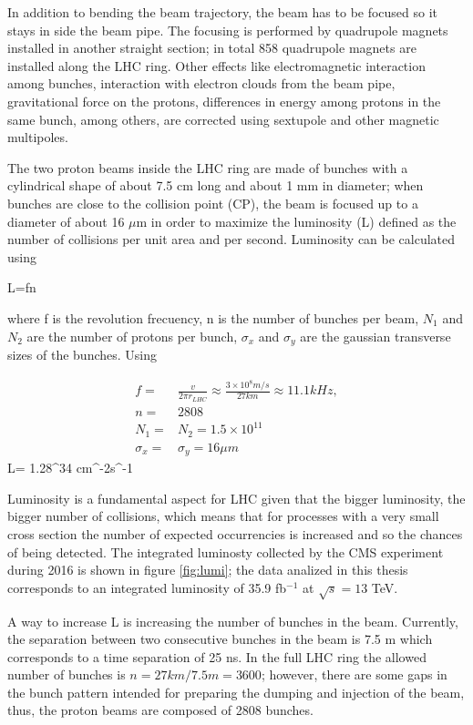 \noindent In addition to bending the beam trajectory, the beam has to be focused so it stays in side the beam pipe. The focusing is performed by quadrupole magnets installed in another straight section; in total 858 quadrupole magnets are installed along the LHC ring. Other effects like electromagnetic interaction among bunches, interaction with electron clouds from the beam pipe, gravitational force on the protons, differences in energy among protons in the same bunch, among others, are corrected using sextupole and other magnetic multipoles.     

\noindent The two proton beams inside the LHC ring are made of bunches with a cylindrical shape of about 7.5 cm long and about 1 mm in diameter; when bunches are close to the collision point (CP), the beam is focused up to a diameter of about 16 $\mu$m in order to maximize the luminosity (L) defined as the number of collisions per unit area and per second. Luminosity can be calculated using

\beqn
L=fn
\eeqn

\noindent where f is the revolution frecuency, n is the number of bunches per beam,  $N_1$ and $N_2$ are the number of protons per bunch,  $\sigma_x$ and $\sigma_y$ are the gaussian transverse sizes of the bunches. Using

\begin{align}
  f=&\frac{v}{2\pi r_{LHC}}\approx\frac{3\times10^8m/s}{27km}\approx 11.1 kHz,\nonumber \\
  n=&2808\nonumber \\ 
  N_1=&N_2=1.5\times 10^{11}\nonumber\\
  \sigma_x=&\sigma_y=16\mu m\nonumber
\end{align}
\beqn
L= 1.28^{34} cm^{-2}s^{-1}
\eeqn

\noindent Luminosity is a fundamental aspect for LHC given that the bigger luminosity, the bigger number of collisions, which means that for processes with a very small cross section the number of expected occurrencies is increased and so the chances of being detected. The integrated luminosty collected by the CMS experiment during 2016 is shown in figure \ref{fig:lumi}; the data analized in this thesis corresponds to an integrated luminosity of 35.9 fb$^{-1}$ at $\sqrt{s}=13$ TeV.

\noindent A way to increase L is increasing the number of bunches in the beam. Currently, the separation between two consecutive bunches in the beam is 7.5 m which corresponds to a time separation of 25 ns. In the full LHC ring the allowed number of bunches is $n=27km/7.5m=3600$; however, there are some gaps in the bunch pattern intended for preparing the dumping and injection of the beam, thus, the proton beams are composed of 2808 bunches. 

